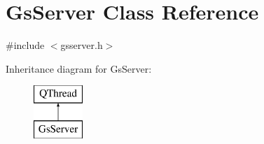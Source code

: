 \hypertarget{class_gs_server}{}\section{Gs\+Server Class Reference}
\label{class_gs_server}


{\ttfamily \#include $<$gsserver.\+h$>$}

Inheritance diagram for Gs\+Server\+:\begin{figure}[H]
\begin{center}
\leavevmode
\includegraphics[height=2.000000cm]{class_gs_server}
\end{center}
\end{figure}
